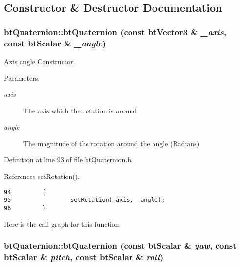 \subsection{Constructor \& Destructor Documentation}
\hypertarget{classbt_quaternion_2b2e9ed0014eb26ed076808fb76e9d69}{
\subsubsection[btQuaternion]{\setlength{\rightskip}{0pt plus 5cm}btQuaternion::btQuaternion (const btVector3 \& {\em \_\-axis}, \/  const btScalar \& {\em \_\-angle})}}
\label{classbt_quaternion_2b2e9ed0014eb26ed076808fb76e9d69}


Axis angle Constructor. 

\begin{Desc}
\item[Parameters:]
\begin{description}
\item[{\em axis}]The axis which the rotation is around \item[{\em angle}]The magnitude of the rotation around the angle (Radians) \end{description}
\end{Desc}


Definition at line 93 of file btQuaternion.h.

References setRotation().

\begin{Code}\begin{verbatim}94         { 
95                 setRotation(_axis, _angle); 
96         }
\end{verbatim}
\end{Code}




Here is the call graph for this function:\hypertarget{classbt_quaternion_8bd5d699377ba585749d325076616ffb}{
\subsubsection[btQuaternion]{\setlength{\rightskip}{0pt plus 5cm}btQuaternion::btQuaternion (const btScalar \& {\em yaw}, \/  const btScalar \& {\em pitch}, \/  const btScalar \& {\em roll})}}
\label{classbt_quaternion_8bd5d699377ba585749d325076616ffb}


